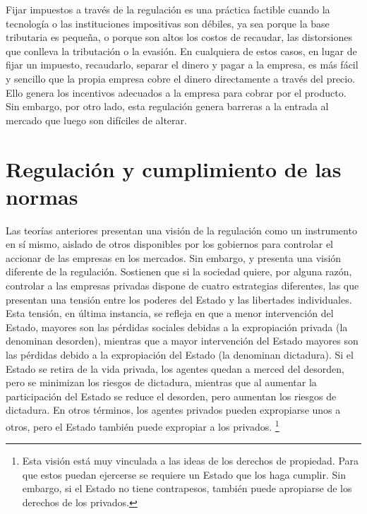 \documentclass[
  12pt,
  spanish,
]{book}
\begin{document}
Fijar impuestos a través de la regulación es una práctica factible
cuando la tecnología o las instituciones impositivas son débiles, ya sea
porque la base tributaria es pequeña, o porque son altos los costos de
recaudar, las distorsiones que conlleva la tributación o la evasión. En
cualquiera de estos casos, en lugar de fijar un impuesto, recaudarlo,
separar el dinero y pagar a la empresa, es más fácil y sencillo que la
propia empresa cobre el dinero directamente a través del precio. Ello
genera los incentivos adecuados a la empresa para cobrar por el
producto. Sin embargo, por otro lado, esta regulación genera barreras a
la entrada al mercado que luego son difíciles de alterar.

\hypertarget{regulaciuxf3n-y-cumplimiento-de-las-normas}{%
\section{Regulación y cumplimiento de las
normas}\label{regulaciuxf3n-y-cumplimiento-de-las-normas}}

Las teorías anteriores presentan una visión de la regulación como un
instrumento en sí mismo, aislado de otros disponibles por los gobiernos
para controlar el accionar de las empresas en los mercados. Sin embargo,
\citet{Djankov2003} y \citet{Shleifer2005} presenta una visión diferente
de la regulación. Sostienen que si la sociedad quiere, por alguna razón,
controlar a las empresas privadas dispone de cuatro estrategias
diferentes, las que presentan una tensión entre los poderes del Estado y
las libertades individuales. Esta tensión, en última instancia, se
refleja en que a menor intervención del Estado, mayores son las pérdidas
sociales debidas a la expropiación privada (la denominan desorden),
mientras que a mayor intervención del Estado mayores son las pérdidas
debido a la expropiación del Estado (la denominan dictadura). Si el
Estado se retira de la vida privada, los agentes quedan a merced del
desorden, pero se minimizan los riesgos de dictadura, mientras que al
aumentar la participación del Estado se reduce el desorden, pero
aumentan los riesgos de dictadura. En otros términos, los agentes
privados pueden expropiarse unos a otros, pero el Estado también puede
expropiar a los privados. \footnote{Esta visión está muy vinculada a las
  ideas de los derechos de propiedad. Para que estos puedan ejercerse se
  requiere un Estado que los haga cumplir. Sin embargo, si el Estado no
  tiene contrapesos, también puede apropiarse de los derechos de los
  privados.}
\end{document}
